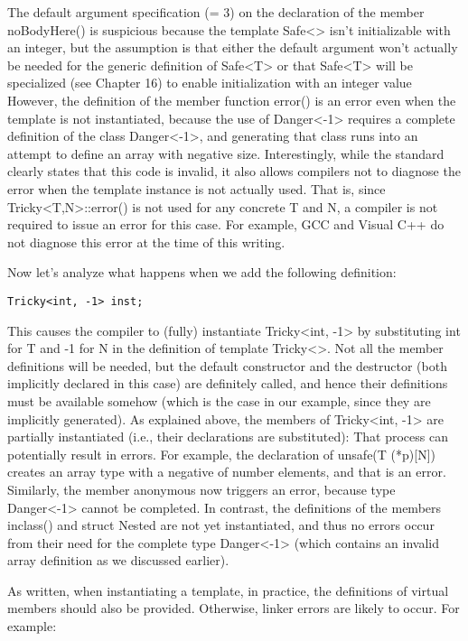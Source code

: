 The default argument specification (= 3) on the declaration of the member noBodyHere() is suspicious because the template Safe<> isn’t initializable with an integer, but the assumption is that either the default argument won’t actually be needed for the generic definition of Safe<T> or that Safe<T> will be specialized (see Chapter 16) to enable initialization with an integer value However, the definition of the member function error() is an error even when the template is not instantiated, because the use of Danger<-1> requires a complete definition of the class Danger<-1>, and generating that class runs into an attempt to define an array with negative size. Interestingly, while the standard clearly states that this code is invalid, it also allows compilers not to diagnose the error when the template instance is not actually used. That is, since Tricky<T,N>::error() is not used for any concrete T and N, a compiler is not required to issue an error for this case. For example, GCC and Visual C++ do not diagnose this error at the time of this writing.

Now let’s analyze what happens when we add the following definition:

\begin{lstlisting}[style=styleCXX]
Tricky<int, -1> inst;
\end{lstlisting}

This causes the compiler to (fully) instantiate Tricky<int, -1> by substituting int for T and -1 for N in the definition of template Tricky<>. Not all the member definitions will be needed, but the default constructor and the destructor (both implicitly declared in this case) are definitely called, and hence their definitions must be available somehow (which is the case in our example, since they are implicitly generated). As explained above, the members of Tricky<int, -1> are partially instantiated (i.e., their declarations are substituted): That process can potentially result in errors. For example, the declaration of unsafe(T (*p)[N]) creates an array type with a negative of number elements, and that is an error. Similarly, the member anonymous now triggers an error, because type Danger<-1> cannot be completed. In contrast, the definitions of the members inclass() and struct Nested are not yet instantiated, and thus no errors occur from their need for the complete type Danger<-1> (which contains an invalid array definition as we discussed earlier).

As written, when instantiating a template, in practice, the definitions of virtual members should also be provided. Otherwise, linker errors are likely to occur. For example:

